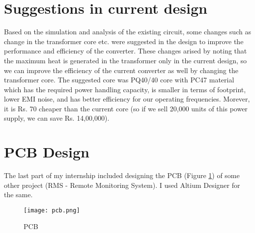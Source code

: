 \section{Suggestions in current design}
Based on the simulation and analysis of the existing circuit, some changes such as change in the transformer core etc. were suggested in the design to improve the performance and efficiency of the converter. These changes arised by noting that the maximum heat is generated in the transformer only in the current design, so we can improve the efficiency of the current converter as well by changing the transformer core.
The suggested core was PQ40/40 core with PC47 material which has the required power handling capacity, is smaller in terms of footprint, lower EMI noise, and has better efficiency for our operating frequencies. Morever, it is Rs. 70 cheaper than the current core (so if we sell 20,000 units of this power supply, we can save Rs. 14,00,000).

\section{PCB Design}
The last part of my internship included designing the PCB (Figure \ref{fig:pcb_out}) of some other project (RMS - Remote Monitoring System). I used Altium Designer for the same.
\begin{figure}[H]
    \centering
    \texttt{[image: pcb.png]}
    \caption{PCB}
    \label{fig:pcb_out}
\end{figure}